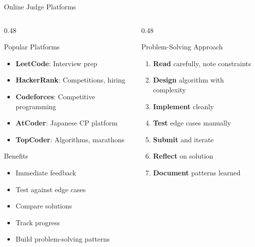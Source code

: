 \documentclass[aspectratio=169,xcolor=dvipsnames]{beamer}
\begin{document}
\begin{frame}{Online Judge Platforms}
  \begin{columns}
    \begin{column}{0.48\textwidth}
      \begin{block}{Popular Platforms}
        \begin{itemize}
          \item \textbf{LeetCode}: Interview prep
          \item \textbf{HackerRank}: Competitions, hiring
          \item \textbf{Codeforces}: Competitive programming
          \item \textbf{AtCoder}: Japanese CP platform
          \item \textbf{TopCoder}: Algorithms, marathons
        \end{itemize}
      \end{block}

      \vspace{0.3cm}

      \begin{block}{Benefits}
        \begin{itemize}
          \item Immediate feedback
          \item Test against edge cases
          \item Compare solutions
          \item Track progress
          \item Build problem-solving patterns
        \end{itemize}
      \end{block}
    \end{column}
    \begin{column}{0.48\textwidth}
      \begin{block}{Problem-Solving Approach}
        \begin{enumerate}
          \item \textbf{Read} carefully, note constraints
          \item \textbf{Design} algorithm with complexity
          \item \textbf{Implement} cleanly
          \item \textbf{Test} edge cases manually
          \item \textbf{Submit} and iterate
          \item \textbf{Reflect} on solution
          \item \textbf{Document} patterns learned
        \end{enumerate}
      \end{block}


\end{column}
\end{columns}
\end{frame}
\end{document}
